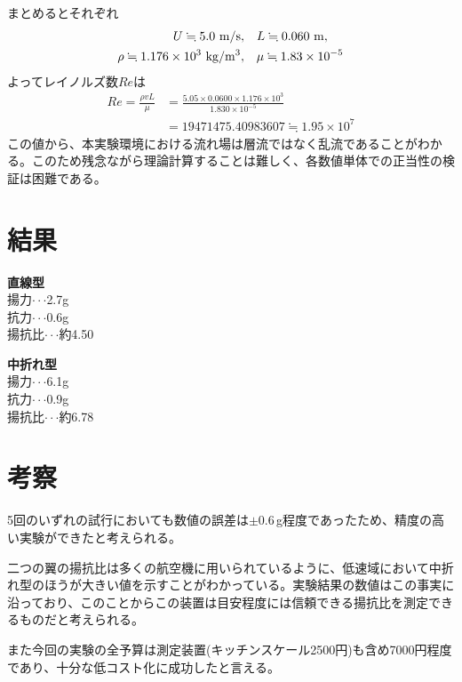 \documentclass[11pt,b5paper,papersize,dvipdfmx]{jsbook}
\begin{document}
まとめるとそれぞれ
\begin{align*}
  U \fallingdotseq 5.0\ \rm{m/s},&\quad
  L \fallingdotseq 0.060\ \rm{m},\\
  \rho \fallingdotseq 1.176\times 10^3\ \rm{kg/m^3},&\quad
  \mu \fallingdotseq 1.83\times 10^{-5}
\end{align*}
よってレイノルズ数$Re$は
\begin{align*}
  Re = \frac{\rho vL}{\mu} &= \frac{5.05 \times 0.0600 \times 1.176 \times 10^3}{1.830\times 10^{-5}}\\
  &= 19471475.40983607 \fallingdotseq 1.95 \times 10^7
\end{align*}
この値から、本実験環境における流れ場は層流ではなく乱流であることがわかる。このため残念ながら理論計算することは難しく、各数値単体での正当性の検証は困難である。

%
\section{結果}
\begin{minipage}{0.45\hsize}
  \begin{center}
    {\bf 直線型}\\
    揚力$\cdot \cdot \cdot$2.7g\\
    抗力$\cdot \cdot \cdot$0.6g\\
    揚抗比$\cdot \cdot \cdot$約4.50\\
  \end{center}
\end{minipage}
\begin{minipage}{0.45\hsize}
  \begin{center}
    {\bf 中折れ型}\\
    揚力$\cdot \cdot \cdot$6.1g\\
    抗力$\cdot \cdot \cdot$0.9g\\
    揚抗比$\cdot \cdot \cdot$約6.78
  \end{center}
\end{minipage}

%
\section{考察}
5回のいずれの試行においても数値の誤差は$\pm 0.6$\,g程度であったため、精度の高い実験ができたと考えられる。\par
二つの翼の揚抗比は多くの航空機に用いられているように、低速域において中折れ型のほうが大きい値を示すことがわかっている。実験結果の数値はこの事実に沿っており、このことからこの装置は目安程度には信頼できる揚抗比を測定できるものだと考えられる。\par
また今回の実験の全予算は測定装置(キッチンスケール2500円)も含め7000円程度であり、十分な低コスト化に成功したと言える。
 
\end{document}
